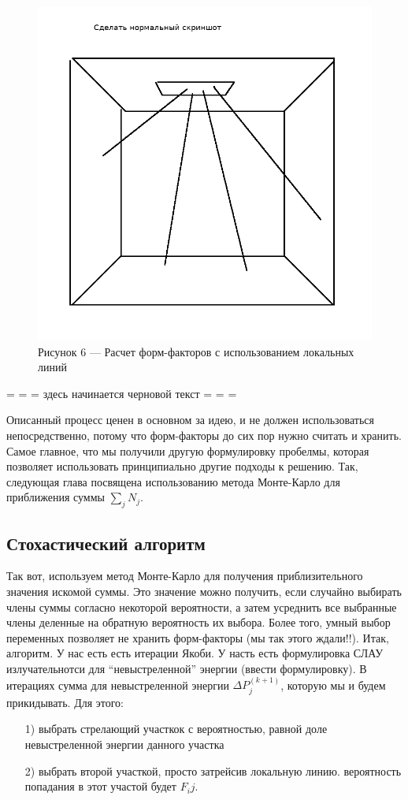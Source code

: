 \documentclass[12pt]{article}
\begin{document}
\begin{figure}[h]
\centering
\includegraphics[scale=0.3]{local_lines.png}
\caption*{Рисунок 6 --- Расчет форм-факторов с использованием локальных линий}
\end{figure}

\begin{center}= = = здесь начинается черновой текст = = =\end{center}
Описанный процесс ценен в основном за идею, и не должен использоваться непосредственно, потому что форм-факторы до сих пор нужно считать и хранить. Самое главное, что мы получили другую формулировку пробелмы, которая позволяет использовать принципиально другие подходы к решению. Так, следующая глава посвящена использованию метода Монте-Карло для приближения суммы $\sum_j N_j$.

\subsection{Стохастический алгоритм}
Так вот, используем метод Монте-Карло для получения приблизительного значения искомой суммы. Это значение можно получить, если случайно выбирать члены суммы согласно некоторой вероятности, а затем усреднить все выбранные члены деленные на обратную вероятность их выбора. Более того, умный выбор переменных позволяет не хранить форм-факторы (мы так этого ждали!!). Итак, алгоритм. У нас есть есть итерации Якоби. У насть есть формулировка СЛАУ излучательнотси для ``невыстреленной'' энергии (ввести формулировку). В итерациях сумма для невыстреленной энергии $\Delta P_j^{(k+1)}$, которую мы и будем прикидывать. Для этого:
\begin{enumerate}
\item[1)] выбрать стрелающий участкок с вероятностью, равной доле невыстреленной энергии данного участка
\item[2)] выбрать второй участкой, просто затрейсив локальную линию. вероятность попадания в этот участой будет $F_ij$.
\end{enumerate}
\end{document}
